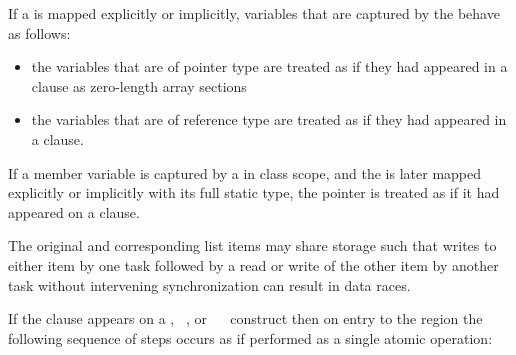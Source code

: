 \begin{cppspecific}
If a  is mapped explicitly or implicitly, variables
that are captured by the  behave as follows:
\begin{itemize}
\item the variables that are of pointer type are treated as if they had
appeared in a  clause as zero-length array sections

\item the variables that are of reference type are treated as if they
had appeared in a  clause.
\end{itemize}

If a member variable is captured by a  in class scope, and
the  is later mapped explicitly or implicitly with its
full static type, the  pointer is treated as if it had
appeared on a  clause.

\end{cppspecific}

The original and corresponding list items may share storage such that writes to either
item by one task followed by a read or write of the other item by another task without
intervening synchronization can result in data races.

If the  clause appears on a , ~, or ~~ construct then on entry to the region the following sequence of steps occurs as if performed as a single atomic operation:

